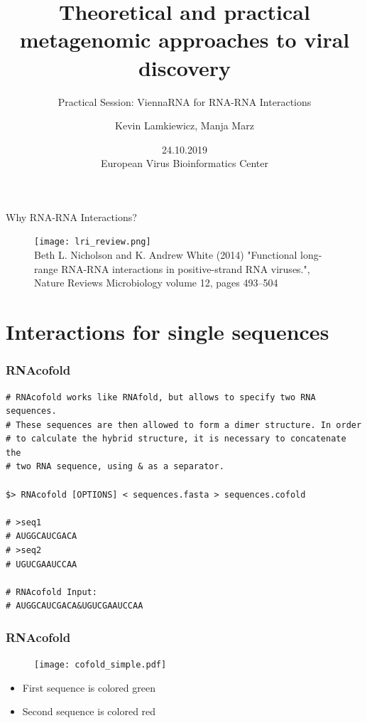 

\title{Theoretical and practical metagenomic approaches to viral discovery}
\subtitle{Practical Session: ViennaRNA for RNA-RNA Interactions}
\author{Kevin Lamkiewicz, Manja Marz}
\date{24.10.2019\\[1em]European Virus Bioinformatics Center}



\begin{frame}
  \maketitle
\end{frame}

\begin{frame}[c]{Why RNA-RNA Interactions?}
  \pause
  \begin{figure}[htbp]
    \centering
    \texttt{[image: lri\_review.png]}\\
    {\tiny Beth L. Nicholson and K. Andrew White (2014) "Functional long-range RNA-RNA interactions in positive-strand RNA viruses.",\\
     Nature Reviews Microbiology volume 12, pages 493–504}
  \end{figure}
\end{frame}

\section[Sequences]{Interactions for single sequences}


\begin{frame}[c, fragile]\frametitle{RNAcofold}
  \begin{lstlisting}
# RNAcofold works like RNAfold, but allows to specify two RNA sequences.
# These sequences are then allowed to form a dimer structure. In order
# to calculate the hybrid structure, it is necessary to concatenate the
# two RNA sequence, using & as a separator.

$> RNAcofold [OPTIONS] < sequences.fasta > sequences.cofold

# >seq1
# AUGGCAUCGACA
# >seq2
# UGUCGAAUCCAA

# RNAcofold Input:
# AUGGCAUCGACA&UGUCGAAUCCAA
  \end{lstlisting}
\end{frame}

\begin{frame}[c]\frametitle{RNAcofold}
  \begin{minipage}[c]{0.4\textwidth}
  \begin{figure}
    \centering
    \texttt{[image: cofold\_simple.pdf]}
  \end{figure}
\end{minipage}\hfill\begin{minipage}[c]{0.55\textwidth}
  \begin{itemize}
    \item First sequence is colored green
    \item Second sequence is colored red\\[3em]
  \end{itemize}
\end{minipage}
\end{frame}

